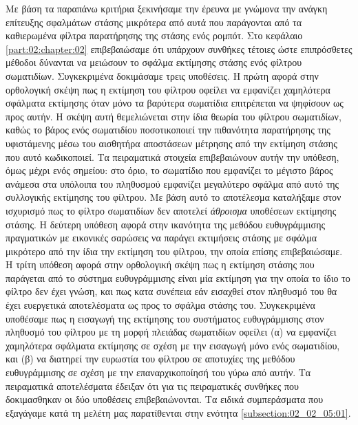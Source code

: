 Με βάση τα παραπάνω κριτήρια ξεκινήσαμε την έρευνα με γνώμονα την ανάγκη
επίτευξης σφαλμάτων στάσης μικρότερα από αυτά που παράγονται από τα καθιερωμένα
φίλτρα παρατήρησης της στάσης ενός ρομπότ. Στο κεφάλαιο
\ref{part:02:chapter:02} επιβεβαιώσαμε ότι υπάρχουν συνθήκες τέτοιες ώστε
επιπρόσθετες μέθοδοι δύνανται να μειώσουν το σφάλμα εκτίμησης στάσης ενός
φίλτρου σωματιδίων. Συγκεκριμένα δοκιμάσαμε τρεις υποθέσεις. Η πρώτη αφορά στην
ορθολογική σκέψη πως η εκτίμηση του φίλτρου οφείλει να εμφανίζει χαμηλότερα
σφάλματα εκτίμησης όταν μόνο τα βαρύτερα σωματίδια επιτρέπεται να ψηφίσουν ως
προς αυτήν. Η σκέψη αυτή θεμελιώνεται στην ίδια θεωρία του φίλτρου σωματιδίων,
καθώς το βάρος ενός σωματιδίου ποσοτικοποιεί την πιθανότητα παρατήρησης της
υφιστάμενης μέσω του αισθητήρα αποστάσεων μέτρησης από την εκτίμηση στάσης που
αυτό κωδικοποιεί. Τα πειραματικά στοιχεία επιβεβαιώνουν αυτήν την υπόθεση, όμως
μέχρι ενός σημείου: στο όριο, το σωματίδιο που εμφανίζει το μέγιστο βάρος
ανάμεσα στα υπόλοιπα του πληθυσμού εμφανίζει μεγαλύτερο σφάλμα από αυτό της
συλλογικής εκτίμησης του φίλτρου. Με βάση αυτό το αποτέλεσμα καταλήξαμε στον
ισχυρισμό πως το φίλτρο σωματιδίων δεν αποτελεί \textit{άθροισμα} υποθέσεων
εκτίμησης στάσης. Η δεύτερη υπόθεση αφορά στην ικανότητα της μεθόδου
ευθυγράμμισης πραγματικών με εικονικές σαρώσεις να παράγει εκτιμήσεις στάσης με
σφάλμα μικρότερο από την ίδια την εκτίμηση του φίλτρου, την οποία επίσης
επιβεβαιώσαμε. Η τρίτη υπόθεση αφορά στην ορθολογική σκέψη πως η εκτίμηση
στάσης που παράγεται από το σύστημα ευθυγράμμισης είναι μία εκτίμηση για την
οποία το ίδιο το φίλτρο δεν έχει γνώση, και πως κατα συνέπεια εάν εισαχθεί στον
πληθυσμό του θα έχει ευεργετικά αποτελέσματα ως προς το σφάλμα στάσης του.
Συγκεκριμένα υποθέσαμε πως η εισαγωγή της εκτίμησης του συστήματος
ευθυγράμμισης στον πληθυσμό του φίλτρου με τη μορφή πλειάδας σωματιδίων οφείλει
(α) να εμφανίζει χαμηλότερα σφάλματα εκτίμησης σε σχέση με την εισαγωγή μόνο
ενός σωματιδίου, και (β) να διατηρεί την ευρωστία του φίλτρου σε αποτυχίες της
μεθόδου ευθυγράμμισης σε σχέση με την επαναρχικοποίησή του γύρω από αυτήν. Τα
πειραματικά αποτελέσματα έδειξαν ότι για τις πειραματικές συνθήκες που
δοκιμασθηκαν οι δύο υποθέσεις επιβεβαιώνονται. Τα ειδικά συμπεράσματα που
εξαγάγαμε κατά τη μελέτη μας παρατίθενται στην ενότητα
\ref{subsection:02_02_05:01}.


